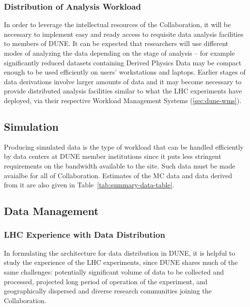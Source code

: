 \subsubsection{Distribution of Analysis Workload}
In order to leverage the intellectual resources of the Collaboration, it will be necessary to implement easy and ready access to
requisite data analysis facilities to members of DUNE. It can be expected that researchers will use different modes of analyzing
the data depending on the stage of analysis -- for example significantly reduced datasets containing Derived Physics Data
may be compact enough to be used efficiently on users' workstations and laptops. Earlier stages of data derivations
involve larger amounts of data and it may become necessary to provide distributed analysis facilities similar to what the LHC
experiments have deployed, via their respective Workload Management Systems (\ref{sec:dune-wms}).

\subsection{Simulation}
Producing simulated data is the type of workload that can be handled efficiently by data centers at DUNE member institutions
since it puts less stringent requirements on the bandwidth available to the site.
Such data must be made avaialbe for all of Collaboration. Estimates of the MC data and data derived from it are also given
in Table~\ref{tab:summary-data-table}.


\subsection{Data Management}
\label{sec:data-mgt}
\subsubsection{LHC Experience with Data Distribution}
\label{sec:data-monarc}
In formulating the architecture for data distribution in DUNE, it is helpful to study the experience of the LHC experiments,
since DUNE shares much of the same challenges: potentially significant  volume of data to be collected and processed,
projected long period of operation of the experiment, and geographically dispersed and diverse research communities joining the Collaboration.


